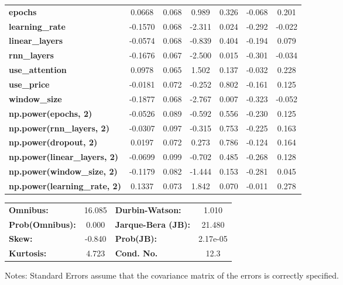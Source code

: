 \begin{center}
\begin{tabular}{lcccccc}
\textbf{epochs}                            &       0.0668  &        0.068     &     0.989  &         0.326        &       -0.068    &        0.201     \\
\textbf{learning\_rate}                    &      -0.1570  &        0.068     &    -2.311  &         0.024        &       -0.292    &       -0.022     \\
\textbf{linear\_layers}                    &      -0.0574  &        0.068     &    -0.839  &         0.404        &       -0.194    &        0.079     \\
\textbf{rnn\_layers}                       &      -0.1676  &        0.067     &    -2.500  &         0.015        &       -0.301    &       -0.034     \\
\textbf{use\_attention}                    &       0.0978  &        0.065     &     1.502  &         0.137        &       -0.032    &        0.228     \\
\textbf{use\_price}                        &      -0.0181  &        0.072     &    -0.252  &         0.802        &       -0.161    &        0.125     \\
\textbf{window\_size}                      &      -0.1877  &        0.068     &    -2.767  &         0.007        &       -0.323    &       -0.052     \\
\textbf{np.power(epochs, 2)}               &      -0.0526  &        0.089     &    -0.592  &         0.556        &       -0.230    &        0.125     \\
\textbf{np.power(rnn\_layers, 2)}          &      -0.0307  &        0.097     &    -0.315  &         0.753        &       -0.225    &        0.163     \\
\textbf{np.power(dropout, 2)}              &       0.0197  &        0.072     &     0.273  &         0.786        &       -0.124    &        0.164     \\
\textbf{np.power(linear\_layers, 2)}       &      -0.0699  &        0.099     &    -0.702  &         0.485        &       -0.268    &        0.128     \\
\textbf{np.power(window\_size, 2)}         &      -0.1179  &        0.082     &    -1.444  &         0.153        &       -0.281    &        0.045     \\
\textbf{np.power(learning\_rate, 2)}       &       0.1337  &        0.073     &     1.842  &         0.070        &       -0.011    &        0.278     \\
\bottomrule
\end{tabular}
\begin{tabular}{lclc}
\textbf{Omnibus:}       & 16.085 & \textbf{  Durbin-Watson:     } &    1.010  \\
\textbf{Prob(Omnibus):} &  0.000 & \textbf{  Jarque-Bera (JB):  } &   21.480  \\
\textbf{Skew:}          & -0.840 & \textbf{  Prob(JB):          } & 2.17e-05  \\
\textbf{Kurtosis:}      &  4.723 & \textbf{  Cond. No.          } &     12.3  \\
\bottomrule
\end{tabular}
\end{center}

Notes: \newline
 [1] Standard Errors assume that the covariance matrix of the errors is correctly specified.